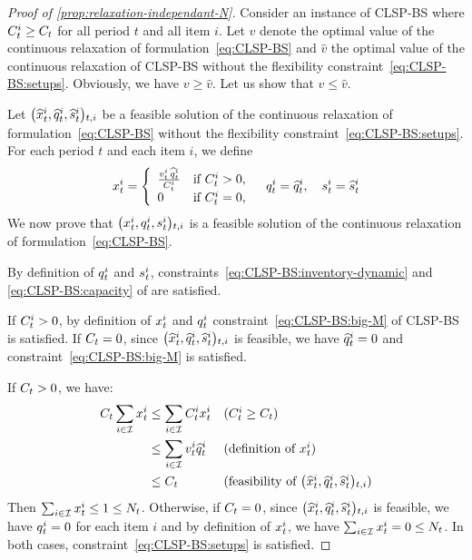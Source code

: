 \begin{proof}[Proof of \cref{prop:relaxation-independant-N}]
Consider an instance of CLSP-BS where $C_t^i\ge C_t$ for all period $t$ and all item $i$.
Let $v$ denote the optimal value of the continuous relaxation of formulation~\eqref{eq:CLSP-BS} and $\widehat{v}$ the optimal value of the continuous relaxation of CLSP-BS without the flexibility constraint~\eqref{eq:CLSP-BS:setups}.
Obviously, we have $v \ge \widehat{v}$.
Let us show that $v \le \widehat{v}$.

Let $\bracket{\widehat{\setup}_t^i, \widehat{\quantity}_t^i, \widehat{\inventory}_t^i}_{t,i}$ be a feasible solution of the continuous relaxation of formulation~\eqref{eq:CLSP-BS} without the flexibility constraint~\eqref{eq:CLSP-BS:setups}.
For each period $t$ and each item $i$, we define
\begin{equation}
  \setup_t^i=
  \left\{
  \begin{array}{ll}
  \frac{\rate_t^i\,\widehat{\quantity}_t^i}{\capacity_t^i} & \mbox{if}\ \capacity_t^i>0,
  \\
  0 & \mbox{if}\ \capacity_t^i=0,
  \end{array}
  \right.
  \quad
  \quantity_t^i=\widehat{\quantity}_t^i
  ,\quad
  \inventory_t^i=\widehat{\inventory}_t^i
\end{equation}
We now prove that $\bracket{\setup_t^i, \quantity_t^i, \inventory_t^i}_{t,i}$ is a feasible solution of the continuous relaxation of formulation~\eqref{eq:CLSP-BS}.

By definition of $q_t^i$ and $s_t^i$, constraints~\eqref{eq:CLSP-BS:inventory-dynamic} and \eqref{eq:CLSP-BS:capacity} of are satisfied.

If $C_t^i>0$, by definition of $x_t^i$ and $q_t^i$ constraint~\eqref{eq:CLSP-BS:big-M} of CLSP-BS is satisfied.
If $C_t=0$, since $\bracket{\widehat{\setup}_t^i, \widehat{\quantity}_t^i, \widehat{\inventory}_t^i}_{t,i}$ is feasible, we have $\widehat{q}_t^i=0$ and constraint~\eqref{eq:CLSP-BS:big-M} is satisfied. 

If $C_t>0$, we have:
\begin{subequations}
\begin{align}
\capacity_t\sum_{i\in\REF}\setup_t^i
&\le
\sum_{i\in\REF}\capacity_t^i\setup_t^i
&& \mbox{($\capacity_t^i\ge\capacity_t$)}
\\
&\le
\sum_{i\in\REF}\rate_t^i\widehat{\quantity}_t^i
&& \mbox{(definition of $\setup_t^i$)}
\\
&\le
\capacity_t
&& \mbox{(feasibility of $\bracket{\widehat{\setup}_t^i, \widehat{\quantity}_t^i, \widehat{\inventory}_t^i}_{t,i}$)}
\end{align}
\end{subequations}
Then $\sum_{i\in\mathcal{I}}x_t^i\le 1\le N_t$.
Otherwise, if $C_t=0$, since $\bracket{\widehat{\setup}_t^i, \widehat{\quantity}_t^i, \widehat{\inventory}_t^i}_{t,i}$ is feasible, we have $q_t^i=0$ for each item $i$ and by definition of $x_t^i$, we have $\sum_{i\in\mathcal{I}}x_t^i=0\le N_t$.
In both cases, constraint~\eqref{eq:CLSP-BS:setups} is satisfied.


\end{proof}
